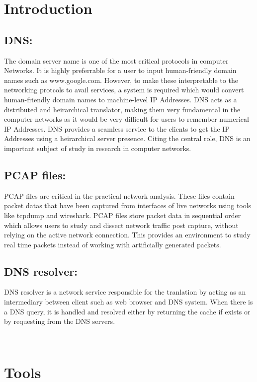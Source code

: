 \documentclass[12pt, a4paper]{report}
\begin{document}
\section{Introduction}

\subsection{DNS:}

The domain server name is one of the most critical protocols in computer Networks. It is highly preferrable for a user to input human-friendly domain names such as www.google.com. However, to make these interpretable to the networking protcols to avail services, a system is required which would convert human-friendly domain names to machine-level IP Addresses. DNS acts as a distributed and heirarchical translator, making them very fundamental in the computer networks as it would be very difficult for users to remember numerical IP Addresses. DNS provides a seamless service to the clients to get the IP Addresses using a heirarchical server presence. Citing the central role, DNS is an important subject of study in research in computer networks.


\subsection{PCAP files:}

PCAP files are critical in the practical network analysis. These files contain packet datas that have been captured from interfaces of live networks using tools like tcpdump and wireshark. PCAP files store packet data in sequential order which allows users to study and dissect network traffic post capture, without relying on the active network connection. This provides an environment to study real time packets instead of working with artificially generated packets.

\subsection{DNS resolver:}

DNS resolver is a network service responsible for the tranlation by acting as an intermediary between client such as web browser and DNS system. When there is a DNS query, it is handled and resolved either by returning the cache if exists or by requesting from the DNS servers.

\
\section{Tools}
\end{document}
